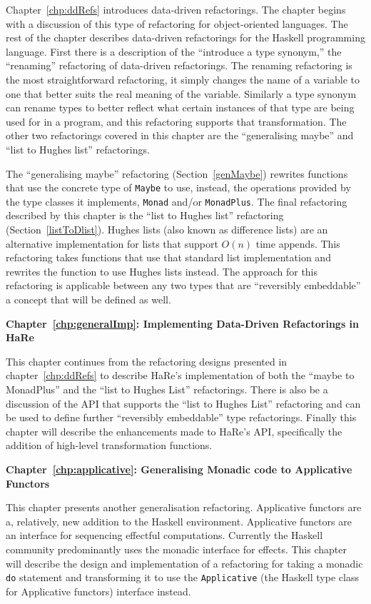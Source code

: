 Chapter~\ref{chp:ddRefs} introduces data-driven refactorings. The chapter begins with a discussion of this type of refactoring for object-oriented languages. The rest of the chapter describes data-driven refactorings for the Haskell programming language. First there is a description of the ``introduce a type synonym,'' the ``renaming'' refactoring of data-driven refactorings. The renaming refactoring is the most straightforward refactoring, it simply changes the name of a variable to one that better suits the real meaning of the variable. Similarly a type synonym can rename types to better reflect what certain instances of that type are being used for in a program, and this refactoring supports that transformation. The other two refactorings covered in this chapter are the ``generalising maybe'' and ``list to Hughes list'' refactorings.

The ``generalising maybe'' refactoring (Section~\ref{genMaybe}) rewrites functions that use the concrete type of \texttt{Maybe} to use, instead, the operations provided by the type classes it implements, \texttt{Monad} and/or \texttt{MonadPlus}. The final refactoring described by this chapter is the ``list to Hughes list'' refactoring (Section~\ref{listToDlist}). Hughes lists (also known as difference lists) are an alternative implementation for lists that support $O(n)$ time appends. This refactoring takes functions that use that standard list implementation and rewrites the function to use Hughes lists instead. The approach for this refactoring is applicable between any two types that are ``reversibly embeddable'' a concept that will be defined as well.

\textbf{Chapter~\ref{chp:generalImp}: Implementing Data-Driven Refactorings in HaRe}

This chapter continues from the refactoring designs presented in chapter~\ref{chp:ddRefs} to describe HaRe's implementation of both the ``maybe to MonadPlus'' and the ``list to Hughes List'' refactorings. There is also be a discussion of the API that  supports the ``list to Hughes List'' refactoring and can be used to define further ``reversibly embeddable'' type refactorings. Finally this chapter will describe the enhancements made to HaRe's API, specifically the addition of high-level transformation functions.

\textbf{Chapter~\ref{chp:applicative}: Generalising Monadic code to Applicative Functors}

This chapter presents another generalisation refactoring. Applicative functors are a, relatively, new addition to the Haskell environment. Applicative functors are an interface for sequencing effectful computations. Currently the Haskell community predominantly uses the monadic interface for effects. This chapter will describe the design and implementation of a refactoring for taking a monadic \texttt{do} statement and transforming it to use the \texttt{Applicative} (the Haskell type class for Applicative functors) interface instead.

